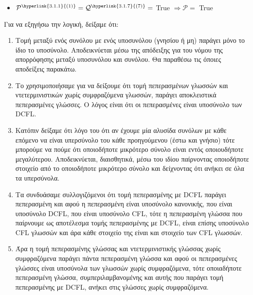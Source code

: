 \begin{tcolorbox}[colback=yellow!15!white, colframe=blue!50!white,
	fonttitle=\bfseries\Large, title = Απόδειξη]
\begin{itemize}
	\item $\mathcal{P}^{\hyperlink{3.1.1}{(1)}} = \mathcal{Q}^{\hyperlink{3.1.7}{(7)}} = $ True $ \Rightarrow
	\mathcal{P} = $ True

\end{itemize}
\end{tcolorbox}

\clearpage
Για να εξηγήσω την λογική, δείξαμε ότι:
\begin{enumerate}
	\item Tομή μεταξύ ενός συνόλου με ενός υποσυνόλου (γνησίου ή μη) παράγει μόνο το ίδιο το υποσύνολο.
	Αποδεικνύεται μέσω της απόδειξης για του νόμου της απορρόφησης μεταξύ υποσυνόλου και συνόλου. Θα παραθέσω τις
	όποιες αποδείξεις παρακάτω.

	\item Tο χρησιμοποιήσαμε για να δείξουμε ότι τομή πεπερασμένων γλωσσών και ντετερμινιστικών χωρίς
	συμφραζόμενα γλωσσών, παράγει αποκλειστικά πεπερασμένες γλώσσες. Ο λόγος είναι ότι οι πεπερασμένες είναι
	υποσύνολο των DCFL.

	\item Κατόπιν δείξαμε ότι λόγο του ότι αν έχουμε μία αλυσίδα συνόλων με κάθε επόμενο να είναι
	υπερσύνολο του κάθε προηγούμενου (έστω και γνήσιο) τότε μπορούμε να πούμε ότι οποιοδήποτε μικρότερο
	σύνολο είναι εντός οποιουδήποτε μεγαλύτερου. Αποδεικνύεται, διαισθητικά, μέσω του ιδίου παίρνοντας οποιοδήποτε
	στοιχείο από το οποιοδήποτε μικρότερο σύνολο και δείχνοντας ότι ανήκει σε όλα τα υπερσύνολα.

	\item Τα συνδυάσαμε συλλογιζόμενοι ότι τομή πεπερασμένης με DCFL παράγει πεπερασμένη και αφού η
	πεπερασμένη είναι υποσύνολο κανονικής, που είναι υποσύνολο DCFL, που είναι υποσύνολο CFL, τότε η
	πεπερασμένη γλώσσα που παίρνουμε ως {αποτέλεσμα τομής πεπερασμένης με DCFL}, είναι επίσης υποσύνολο CFL γλωσσών
	και άρα κάθε στοιχείο της είναι και στοιχείο των CFL γλωσσών.

	\item Άρα η τομή πεπερασμένης γλώσσας και ντετερμινιστικής γλώσσας χωρίς συμφραζόμενα παράγει πάντα πεπερασμένη
	γλώσσα και αφού οι πεπερασμένες γλώσσες είναι υποσύνολα των γλωσσών χωρίς συμφραζόμενα, τότε οποιαδήποτε
	πεπερασμένη γλώσσα, συμπεριλαμβανομένης και αυτής που παράγει τομή πεπερασμένης με DCFL, ανήκει στις γλώσσες
	χωρίς συμφραζόμενα.

\end{enumerate}

\clearpage

